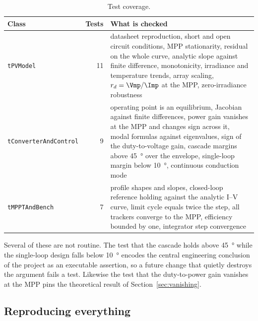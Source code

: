 \begin{table}[htbp]
\centering
\caption{Test coverage.}
\label{tab:tests}
\begin{tabular}{@{}p{}rp{}@{}}
\toprule
\textbf{Class} & \textbf{Tests} & \textbf{What is checked} \\
\midrule
\texttt{tPVModel} & 11 & datasheet reproduction, short and open circuit conditions, MPP stationarity, residual on the whole curve, analytic slope against finite difference, monotonicity, irradiance and temperature trends, array scaling, $r_d = \Vmp/\Imp$ at the MPP, zero-irradiance robustness \\
\texttt{tConverterAndControl} & 9 & operating point is an equilibrium, Jacobian against finite differences, power gain vanishes at the MPP and changes sign across it, modal formulas against eigenvalues, sign of the duty-to-voltage gain, cascade margins above \SI{45}{\degree} over the envelope, single-loop margin below \SI{10}{\degree}, continuous conduction mode \\
\texttt{tMPPTAndBench} & 7 & profile shapes and slopes, closed-loop reference holding against the analytic I--V curve, limit cycle equals twice the step, all trackers converge to the MPP, efficiency bounded by one, integrator step convergence \\
\bottomrule
\end{tabular}
\end{table}

Several of these are not routine. The test that the cascade holds above
\SI{45}{\degree} while the single-loop design falls below \SI{10}{\degree}
encodes the central engineering conclusion of the project as an executable
assertion, so a future change that quietly destroys the argument fails a test.
Likewise the test that the duty-to-power gain vanishes at the MPP pins the
theoretical result of Section~\ref{sec:vanishing}.

\subsection{Reproducing everything}

